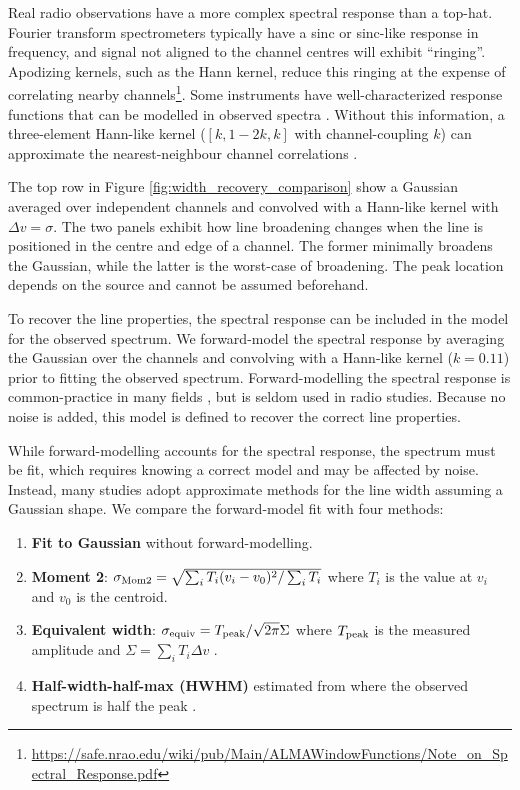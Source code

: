 \documentclass{rnaastex}
\begin{document}
Real radio observations have a more complex spectral response than a top-hat.  Fourier transform spectrometers typically have a sinc or sinc-like response in frequency, and signal not aligned to the channel centres will exhibit ``ringing''.  Apodizing kernels, such as the Hann kernel, reduce this ringing at the expense of correlating nearby channels\footnote{\url{https://safe.nrao.edu/wiki/pub/Main/ALMAWindowFunctions/Note_on_Spectral_Response.pdf}}.  Some instruments have well-characterized response functions that can be modelled in observed spectra \citep{rosolowsky2008}.  Without this information, a three-element Hann-like kernel ($[k, 1 - 2k, k]$ with channel-coupling $k$) can approximate the nearest-neighbour channel correlations \citep{leroy2016}.

The top row in Figure \ref{fig:width_recovery_comparison} show a Gaussian averaged over independent channels and convolved with a Hann-like kernel with $\Delta v=\sigma$.  The two panels exhibit how line broadening changes when the line is positioned in the centre and edge of a channel. The former minimally broadens the Gaussian, while the latter is the worst-case of broadening.  The peak location depends on the source and cannot be assumed beforehand.

To recover the line properties, the spectral response can be included in the model for the observed spectrum.  We forward-model the spectral response by averaging the Gaussian over the channels and convolving with a Hann-like kernel ($k=0.11$) prior to fitting the observed spectrum.  Forward-modelling the spectral response is common-practice in many fields \citep[e.g.,][]{martin2015}, but is seldom used in radio studies.  Because no noise is added, this model is defined to recover the correct line properties.

While forward-modelling accounts for the spectral response, the spectrum must be fit, which requires knowing a correct model and may be affected by noise.  Instead, many studies adopt approximate methods for the line width assuming a Gaussian shape. We compare the forward-model fit with four methods:
\begin{enumerate}
    \item {\bf Fit to Gaussian} without forward-modelling.
    \item {\bf Moment 2}: $\sigma_{\rm Mom2}=\sqrt{\sum_i T_i (v_i - v_0)^2 / \sum_i T_i}$ where $T_i$ is the value at $v_i$ and $v_0$ is the centroid.
    \item {\bf Equivalent width}: $\sigma_{\rm equiv} = T_{\rm peak} / \sqrt{2\pi} \Sigma$ where $T_{\rm peak}$ is the measured amplitude and $\Sigma= \sum_i T_i \Delta v$ \citep{heyer2001,leroy2016,sun2018}.
    \item {\bf Half-width-half-max (HWHM)} estimated from where the observed spectrum is half the peak \citep{stilp2013a,stilp2013b,koch2018}.
\end{enumerate}
\end{document}
